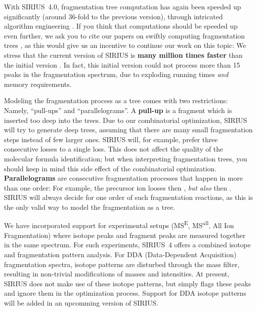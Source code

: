 \documentclass[letterpaper,10pt,openany,oneside]{sphinxmanual}
\begin{document}
With SIRIUS~4.0, fragmentation tree computation has again been speeded up
significantly (around 36-fold to the previous version), through intricated
algorithm engineering \citep{duehrkop18heuristic}.  If you think that
computations should be speeded up even further, we ask you to cite our papers
on swiftly computing fragmentation trees \citep{duehrkop18heuristic,
white15speedy, rauf13finding}, as this would give us an incentive to continue
our work on this topic: We stress that the current version of SIRIUS
is \textbf{many million times faster} than the initial
version \citep{boecker08towards}.  In fact, this initial version could not
process more than 15 peaks in the fragmentation spectrum, due to exploding
running times \emph{and} memory requirements.

Modeling the fragmentation process as a tree comes with two restrictions:
Namely, ``pull-ups'' and ``parallelograms''.  A \textbf{pull-up} is a
fragment which is inserted too deep into the trees.  Due to our combinatorial
optimization, SIRIUS will try to generate deep trees, assuming that there
are many small fragmentation steps instead of few larger ones.  SIRIUS
will, for example, prefer three consecutive  losses to a
single  loss.  This does not affect the quality of the molecular
formula identification; but when interpreting fragmentation trees, you should
keep in mind this side effect of the combinatorial
optimization.  \textbf{Parallelograms} are consecutive fragmentation
processes that happen in more than one order: For example, the precursor ion
looses  then , \emph{but also}  then .
SIRIUS will always decide for one order of such fragmentation reactions, as
this is the only valid way to model the fragmentation as a tree.

We have incorporated support for experimental setups (MS\textsuperscript{E},
MS\textsuperscript{all}, All Ion Fragmentation) where isotope peaks and
fragment peaks are measured together in the same spectrum.  For such
experiments, SIRIUS~4 offers a combined isotope and fragmentation pattern
analysis.  For DDA (Data-Dependent Acquisition) fragmentation spectra,
isotope patterns are disturbed through the mass filter, resulting in
non-trivial modifications of masses and intensities.  At present, SIRIUS does
not make use of these isotope patterns, but simply flags these peaks and
ignore them in the optimization process.  Support for DDA isotope patterns
will be added in an upcomming version of SIRIUS.


\end{document}
